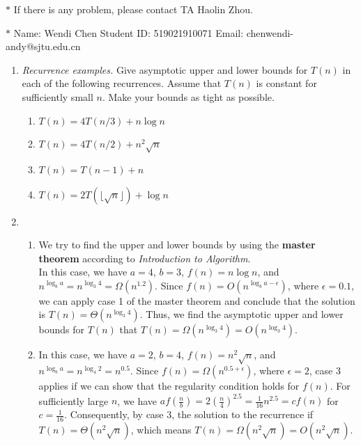 \documentclass[12pt,a4paper]{article}
\makeatletter
\newtheorem*{solution}{Solution}
\theoremstyle{definition}
\renewenvironment{solution}[1][Solution] {\par\pushQED{\qed}\normalfont\topsep6\p@\@plus6\p@\relax\trivlist\item[\hskip\labelsep\bfseries#1\@addpunct{.}]\ignorespaces}{\popQED\endtrivlist\@endpefalse} \makeatother
\makeatother
\begin{document}
\noindent

\noindent{}
\begin{center}
\footnotesize{\color{red}$*$ If there is any problem, please contact TA Haolin Zhou. }

\footnotesize{\color{blue}$*$ Name: Wendi Chen  \quad Student ID: 519021910071 \quad Email: chenwendi-andy@sjtu.edu.cn}
\end{center}

\begin{enumerate}
\item
    \textit{Recurrence examples.} Give asymptotic upper and lower bounds for $T(n)$ in each of the following recurrences. Assume that $T(n)$ is constant for sufficiently small $n$. Make your bounds as tight as possible.
\begin{enumerate}
	\item $T(n)=4 T(n / 3)+n \log n$
	\item $T(n)=4 T(n / 2)+n^{2} \sqrt{n}$
	\item $T(n)=T(n-1)+n$	
	\item $T(n)=2T(\lfloor \sqrt n\rfloor)+\log n$
\end{enumerate}
\begin{solution}
	~
	\begin{enumerate}
	    \item We try to find the upper and lower bounds by using the \textbf{master theorem} according to \emph{Introduction to Algorithm}. \\
	    In this case, we have $a = 4$, $b = 3$, $f(n) = n\log n$, and $n^{\log_{b}{a}} = n^{\log_{3}{4}} = \Omega(n^{1.2}) $. Since $f(n) = O(n^{\log_{b}{a}-\epsilon})$, where $\epsilon = 0.1$, we can apply case 1 of the master theorem and conclude that the solution is $T(n) = \Theta(n^{\log_{3}{4}})$. Thus, we find the asymptotic upper and lower bounds for $T(n)$ that $T(n) = \Omega(n^{\log_{3}{4}}) = O(n^{\log_{3}{4}})$.
	    
	    \item In this case, we have $a = 2$, $b = 4$, $f(n) = n^2\sqrt{n}$, and $n^{\log_{b}{a}} =n^{\log_{4}{2}}= n^{0.5}$. Since $f(n) = \Omega(n^{0.5+\epsilon})$, where $\epsilon = 2$, case 3 applies if we can show that the regularity condition holds for $f(n)$. For sufficiently large $n$, we have $af(\frac{n}{b}) = 2(\frac{n}{4})^{2.5} = \frac{1}{16}n^{2.5}= cf(n)$ for $c = \frac{1}{16}$. Consequently, by case 3, the solution to the recurrence if $T(n) = \Theta(n^{2} \sqrt{n})$, which means $T(n) = \Omega(n^{2} \sqrt{n}) = O(n^{2} \sqrt{n})$.
	    

\end{enumerate}
\end{solution}
\end{enumerate}
\end{document}
